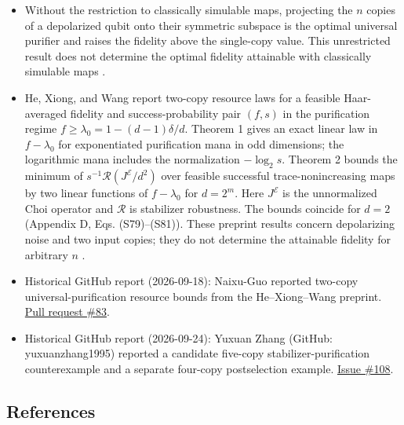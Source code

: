 \begin{itemize}
The final journal supplement, Appendix F, restricts its qubit scans to $0<\delta<1-1/\sqrt3$, with noise and success-probability steps of $0.01$. Zhang's four-copy example at $\delta=1/2$ and five-copy example at $\delta=2/3$ lie outside that sampled noise range .

  \item Without the restriction to classically simulable maps, projecting
  the $n$ copies of a depolarized qubit onto their symmetric subspace is
  the optimal universal purifier and raises the fidelity above the
  single-copy value. This unrestricted result does not determine the
  optimal fidelity attainable with classically simulable maps
  .

  \item He, Xiong, and Wang report two-copy resource laws for a feasible
  Haar-averaged fidelity and success-probability pair $(f,s)$ in the
  purification regime $f\geq\lambda_0=1-(d-1)\delta/d$. Theorem 1 gives an
  exact linear law in $f-\lambda_0$ for exponentiated purification mana in
  odd dimensions; the logarithmic mana includes the normalization
  $-\log_2 s$. Theorem 2 bounds the minimum of
  $s^{-1}\mathcal R(J^{\mathcal E}/d^2)$ over feasible successful
  trace-nonincreasing maps by two linear functions of $f-\lambda_0$ for
  $d=2^m$. Here $J^{\mathcal E}$ is the unnormalized Choi operator and
  $\mathcal R$ is stabilizer robustness. The bounds coincide for $d=2$
  (Appendix D, Eqs. (S79)--(S81)). These preprint results concern depolarizing
  noise and two input copies; they do not determine the attainable fidelity for arbitrary $n$
  .

  \item Historical GitHub report (2026-09-18): Naixu-Guo reported two-copy universal-purification resource bounds from the He--Xiong--Wang preprint. \href{https://github.com/Naixu-Guo/quantum-open-problems/pull/83}{Pull request \#83}.

  \item Historical GitHub report (2026-09-24): Yuxuan Zhang (GitHub: yuxuanzhang1995) reported a candidate five-copy stabilizer-purification counterexample and a separate four-copy postselection example. \href{https://github.com/Naixu-Guo/quantum-open-problems/issues/108}{Issue \#108}.
\end{itemize}

\subsection*{References}

